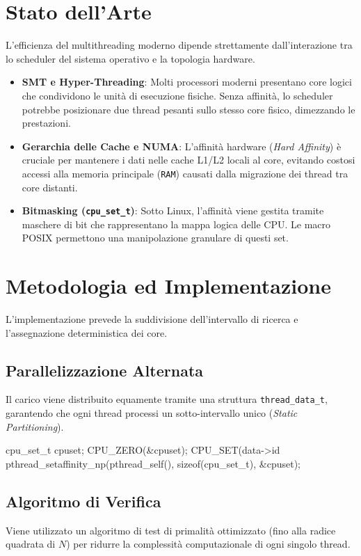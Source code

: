 \documentclass[a4paper,12pt]{article}
\begin{document}
\section{Stato dell'Arte}
L'efficienza del multithreading moderno dipende strettamente dall'interazione tra lo scheduler del sistema operativo e la topologia hardware.
\begin{itemize}
    \item \textbf{SMT e Hyper-Threading}: Molti processori moderni presentano core logici che condividono le unità di esecuzione fisiche. Senza affinità, lo scheduler potrebbe posizionare due thread pesanti sullo stesso core fisico, dimezzando le prestazioni.
    \item \textbf{Gerarchia delle Cache e NUMA}: L'affinità hardware (\textit{Hard Affinity}) è cruciale per mantenere i dati nelle cache L1/L2 locali al core, evitando costosi accessi alla memoria principale (\texttt{RAM}) causati dalla migrazione dei thread tra core distanti.
    \item \textbf{Bitmasking (\texttt{cpu_set_t})}: Sotto Linux, l'affinità viene gestita tramite maschere di bit che rappresentano la mappa logica delle CPU. Le macro POSIX permettono una manipolazione granulare di questi set.
\end{itemize}

\section{Metodologia ed Implementazione}
L'implementazione prevede la suddivisione dell'intervallo di ricerca e l'assegnazione deterministica dei core.

\subsection{Parallelizzazione Alternata}
Il carico viene distribuito equamente tramite una struttura \texttt{thread_data_t}, garantendo che ogni thread processi un sotto-intervallo unico (\textit{Static Partitioning}).
\begin{ccode}
cpu_set_t cpuset;
CPU_ZERO(&cpuset);
CPU_SET(data->id %
pthread_setaffinity_np(pthread_self(), sizeof(cpu_set_t), &cpuset);
\end{ccode}

\subsection{Algoritmo di Verifica}
Viene utilizzato un algoritmo di test di primalità ottimizzato (fino alla radice quadrata di $N$) per ridurre la complessità computazionale di ogni singolo thread.
\end{document}
